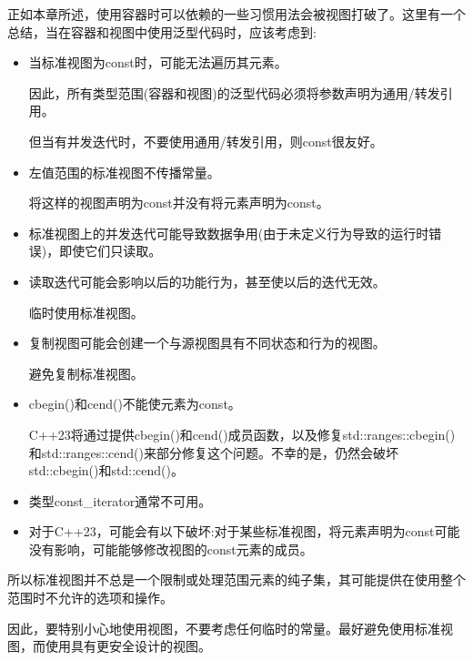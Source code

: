 正如本章所述，使用容器时可以依赖的一些习惯用法会被视图打破了。这里有一个总结，当在容器和视图中使用泛型代码时，应该考虑到:

\begin{itemize}
\item
当标准视图为const时，可能无法遍历其元素。

因此，所有类型范围(容器和视图)的泛型代码必须将参数声明为通用/转发引用。

但当有并发迭代时，不要使用通用/转发引用，则const很友好。

\item
左值范围的标准视图不传播常量。

将这样的视图声明为const并没有将元素声明为const。

\item
标准视图上的并发迭代可能导致数据争用(由于未定义行为导致的运行时错误)，即使它们只读取。

\item
读取迭代可能会影响以后的功能行为，甚至使以后的迭代无效。

临时使用标准视图。

\item
复制视图可能会创建一个与源视图具有不同状态和行为的视图。

避免复制标准视图。

\item
cbegin()和cend()不能使元素为const。

C++23将通过提供cbegin()和cend()成员函数，以及修复std::ranges::cbegin()和std::ranges::cend()来部分修复这个问题。不幸的是，仍然会破坏std::cbegin()和std::cend()。

\item
类型const\_iterator通常不可用。

\item
对于C++23，可能会有以下破坏:对于某些标准视图，将元素声明为const可能没有影响，可能能够修改视图的const元素的成员。
\end{itemize}

所以标准视图并不总是一个限制或处理范围元素的纯子集，其可能提供在使用整个范围时不允许的选项和操作。

因此，要特别小心地使用视图，不要考虑任何临时的常量。最好避免使用标准视图，而使用具有更安全设计的视图。